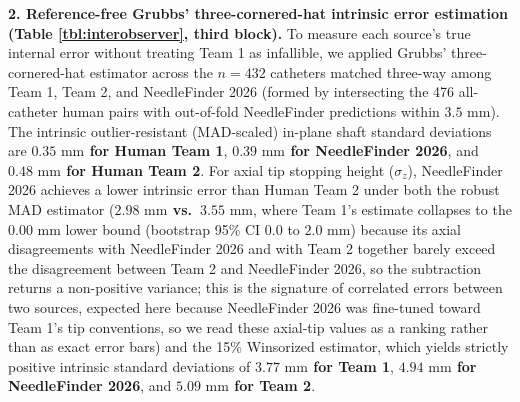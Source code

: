 \documentclass[
  11pt,
]{article}
\begin{document}
\textbf{2. Reference-free Grubbs' three-cornered-hat intrinsic error
estimation (Table \ref{tbl:interobserver}, third block).} To measure
each source's true internal error without treating Team 1 as infallible,
we applied Grubbs' three-cornered-hat estimator across the \(n = 432\)
catheters matched three-way among Team 1, Team 2, and NeedleFinder 2026
(formed by intersecting the 476 all-catheter human pairs with
out-of-fold NeedleFinder predictions within \(3.5\text{ mm}\)). The
intrinsic outlier-resistant (MAD-scaled) in-plane shaft standard
deviations are \textbf{\(0.35\text{ mm}\) for Human Team 1},
\textbf{\(0.39\text{ mm}\) for NeedleFinder 2026}, and
\textbf{\(0.48\text{ mm}\) for Human Team 2}. For axial tip stopping
height (\(\sigma_z\)), NeedleFinder 2026 achieves a lower intrinsic
error than Human Team 2 under both the robust MAD estimator
(\textbf{\(2.98\text{ mm}\) vs.~\(3.55\text{ mm}\)}, where Team 1's
estimate collapses to the \(0.00\text{ mm}\) lower bound (bootstrap 95\%
CI \(0.0\) to \(2.0\text{ mm}\)) because its axial disagreements with
NeedleFinder 2026 and with Team 2 together barely exceed the
disagreement between Team 2 and NeedleFinder 2026, so the subtraction
returns a non-positive variance; this is the signature of correlated
errors between two sources, expected here because NeedleFinder 2026 was
fine-tuned toward Team 1's tip conventions, so we read these axial-tip
values as a ranking rather than as exact error bars) and the 15\%
Winsorized estimator, which yields strictly positive intrinsic standard
deviations of \textbf{\(3.77\text{ mm}\) for Team 1},
\textbf{\(4.94\text{ mm}\) for NeedleFinder 2026}, and
\textbf{\(5.09\text{ mm}\) for Team 2}.
\end{document}
